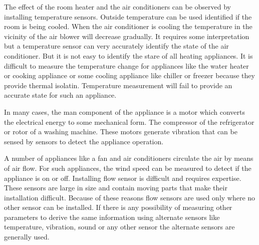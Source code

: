 The effect of the room heater and the air conditioners can be observed by installing temperature sensors. Outside temperature can be used identified if the room is being cooled. When the air conditioner is cooling the temperature in the vicinity of the air blower will decrease gradually. It requires some interpretation but a temperature sensor can very accurately identify the state of the air conditioner. But it is not easy to identify the stare of all heating appliances. It is difficult to measure the temperature change for appliances like the water heater or cooking appliance or some cooling appliance like chiller or freezer because they provide thermal isolatin. Temperature measurement will fail to provide an accurate state for such an appliance.

In many cases, the man component of the appliance is a motor which converts the electrical energy to some mechanical form. The compressor of the refrigerator or rotor of a washing machine. These motors generate vibration that can be sensed by sensors to detect the appliance operation.

A number of appliances like a fan and air conditioners circulate the air by means of air flow. For such appliances, the wind speed can be measured to detect if the appliance is on or off. Installing flow sensor is difficult and requires expertise. These sensors are large in size and contain moving parts that make their installation difficult. Because of these reasons flow sensors are used only where no other sensor can be installed. If there is any possibility of measuring other parameters to derive the same information using alternate sensors like temperature, vibration, sound or any other sensor the alternate sensors are generally used.

